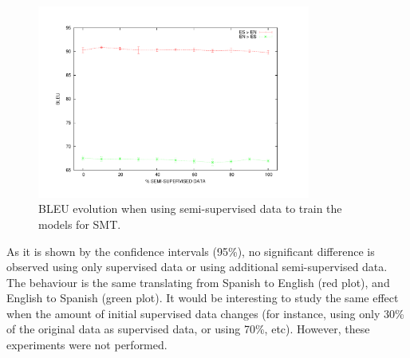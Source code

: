\documentclass[10pt,a4paper]{article}
\begin{document}
\begin{figure}[h]
\centering
\includegraphics[width=0.8\textwidth]{UNSUPERVISED_RESULTS.pdf}
\caption{BLEU evolution when using semi-supervised data to train the models for SMT.}
\label{fig:unsupervised}
\end{figure}

As it is shown by the confidence intervals (95\%), no significant difference is observed using only supervised data or using additional semi-supervised data. The behaviour is the same translating from Spanish to English (red plot), and English to Spanish (green plot). It would be interesting to study the same effect when the amount of initial supervised data changes (for instance, using only 30\% of the original data as supervised data, or using 70\%, etc). However, these experiments were not performed.
\end{document}
